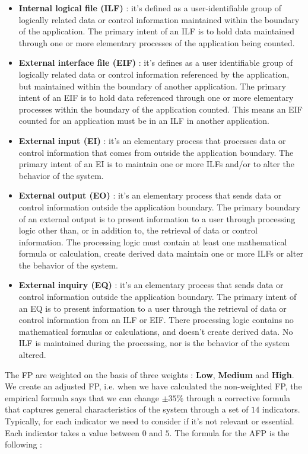\begin{itemize}
    \item \textbf{Internal logical file (ILF)} : it's defined as a user-identifiable group of logically related data or control information maintained within the boundary of the application. The primary intent of an ILF is to hold data maintained through one or more elementary processes of the application being counted.
    \item \textbf{External interface file (EIF)} : it's defines as a user identifiable group of logically related data or control information referenced by the application, but maintained within the boundary of another application. The primary intent of an EIF is to hold data referenced through one or more elementary processes within the boundary of the application counted. This means an EIF counted for an application must be in an ILF in another application.
    \item \textbf{External input (EI)} : it's an elementary process that processes data or control information that comes from outside the application boundary. The primary intent of an EI is to maintain one or more ILFs and/or to alter the behavior of the system.
    \item \textbf{External output (EO)} : it's an elementary process that sends data or control information outside the application boundary. The primary boundary of an external output is to present information to a user through processing logic other than, or in addition to, the retrieval of data or control information. The processing logic must contain at least one mathematical formula or calculation, create derived data maintain one or more ILFs or alter the behavior of the system.
    \item \textbf{External inquiry (EQ)} : it's an elementary process that sends data or control information outside the application boundary. The primary intent of an EQ is to present information to a user through the retrieval of data or control information from an ILF or EIF. There processing logic contains no mathematical formulas or calculations, and doesn't create derived data. No ILF is maintained during the processing, nor is the behavior of the system altered.
\end{itemize}
The FP are weighted on the basis of three weights : \textbf{Low}, \textbf{Medium} and \textbf{High}. We create an adjusted FP, i.e. when we have calculated the non-weighted FP, the empirical formula says that we can change $\pm 35\%$ through a corrective formula that captures general characteristics of the system through a set of $14$ indicators. Typically, for each indicator we need to consider if it's not relevant or essential. Each indicator takes a value between $0$ and $5$. The formula for the AFP is the following :

